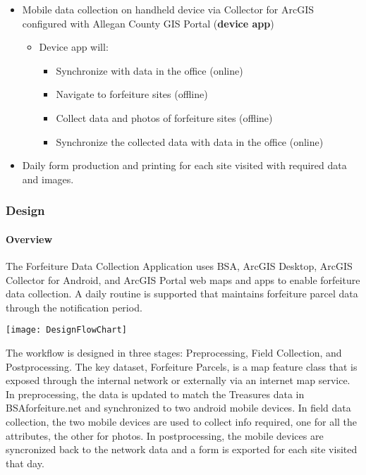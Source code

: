 \documentclass[class=article , crop=false, titlepage, twoside, multi={itemize, figure, verbatim}, float=false]{standalone}
\begin{document}
\begin{itemize} %

\item Mobile data collection on handheld device via Collector for ArcGIS configured with Allegan County GIS Portal  (\textbf{device app})

\begin{itemize} %

\item Device app will:

\begin{itemize} %

\item Synchronize with data in the office (online)
\item Navigate to forfeiture sites (offline)
\item Collect data and photos of forfeiture sites (offline)
\item Synchronize the collected data with data in the office (online)
\end{itemize} %

\end{itemize} %

\item Daily form production and printing for each site visited with required data and images.

\end{itemize} %

\clearpage
\subsubsection{Design}

\paragraph{Overview}The Forfeiture Data Collection Application uses BSA, ArcGIS Desktop, ArcGIS Collector for Android, and ArcGIS Portal web maps and apps to enable forfeiture data collection.  A daily routine is supported that maintains forfeiture parcel data through the notification period.
\begin{center}
    \texttt{[image: DesignFlowChart]}
    \label{img:dflow1}
\end{center}
The workflow is designed in three stages: Preprocessing, Field Collection, and Postprocessing.  The key dataset, Forfeiture Parcels, is a map feature class that is exposed through the internal network or externally via an internet map service.  In preprocessing, the data is updated to match the Treasures data in BSAforfeiture.net and synchronized to two android mobile devices.  In field data collection, the two mobile devices are used to collect info required, one for all the attributes, the other for photos.  In postprocessing, the mobile devices are syncronized back to the network data and a form is exported for each site visited that day.
\end{document}
